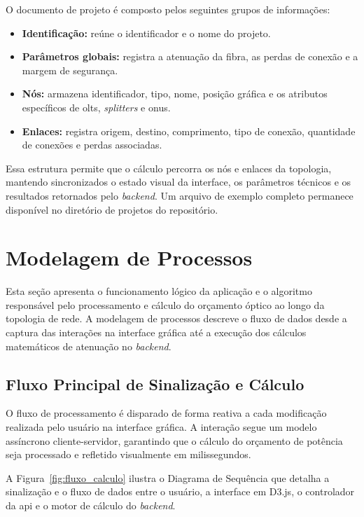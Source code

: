 O documento de projeto é composto pelos seguintes grupos de informações:
\begin{itemize}
        \item \textbf{Identificação:} reúne o identificador e o nome do projeto.
        \item \textbf{Parâmetros globais:} registra a atenuação da fibra, as perdas de conexão e a margem de segurança.
        \item \textbf{Nós:} armazena identificador, tipo, nome, posição gráfica e os atributos específicos de \glspl{olt}, \textit{splitters} e \glspl{onu}.
        \item \textbf{Enlaces:} registra origem, destino, comprimento, tipo de conexão, quantidade de conexões e perdas associadas.
\end{itemize}

Essa estrutura permite que o cálculo percorra os nós e enlaces da topologia, mantendo sincronizados o estado visual da interface, os parâmetros técnicos e os resultados retornados pelo \textit{backend}. Um arquivo de exemplo completo permanece disponível no diretório de projetos do repositório.

\section{Modelagem de Processos}

Esta seção apresenta o funcionamento lógico da aplicação e o algoritmo responsável pelo processamento e cálculo do orçamento óptico ao longo da topologia de rede. A modelagem de processos descreve o fluxo de dados desde a captura das interações na interface gráfica até a execução dos cálculos matemáticos de atenuação no \textit{backend}.

\subsection{Fluxo Principal de Sinalização e Cálculo}

O fluxo de processamento é disparado de forma reativa a cada modificação realizada pelo usuário na interface gráfica. A interação segue um modelo assíncrono cliente-servidor, garantindo que o cálculo do orçamento de potência seja processado e refletido visualmente em milissegundos.

A Figura~\ref{fig:fluxo_calculo} ilustra o Diagrama de Sequência que detalha a sinalização e o fluxo de dados entre o usuário, a interface em D3.js, o controlador da \gls{api} e o motor de cálculo do \textit{backend}.

